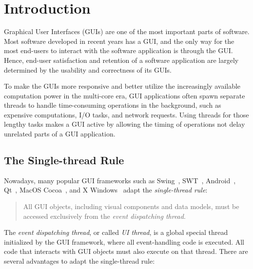 \section{Introduction}

Graphical User Interfaces (GUIs) are one of the most important parts of
software. Most software developed in recent years has a GUI, and the only
way for the most end-users to interact with the software application is through
the GUI. Hence, end-user satisfaction and retention of a software application
 are largely determined by the usability and correctness of
its GUIs.

To make the GUIs more responsive and better utilize the increasingly available
computation power in the multi-core era, GUI applications often spawn separate
threads to handle time-consuming operations in the background, such as expensive
computations, I/O tasks, and network requests. Using threads for those lengthy tasks
makes a GUI active by allowing the timing of operations not delay unrelated parts of a 
GUI application.



\subsection{The Single-thread Rule}

Nowadays, many popular GUI frameworks such as Swing~\cite{swing}, SWT~\cite{swt}, Android~\cite{android},
Qt~\cite{qt}, MacOS Cocoa~\cite{macos}, and X Windows~\cite{xwindow} 
adapt the \textit{single-thread rule}:

\vspace{-2mm}

\begin{quote}
All GUI objects, including visual components and data models, must be
 accessed exclusively from the \textit{event dispatching thread}.
\end{quote}

\vspace{-2mm}

The \textit{event dispatching thread}, or called \textit{UI thread}, is a global special
thread initialized by the GUI framework, where all event-handling code
is executed. All code that interacts with GUI objects must also
execute on that thread.  There are several advantages to adapt the single-thread rule:

